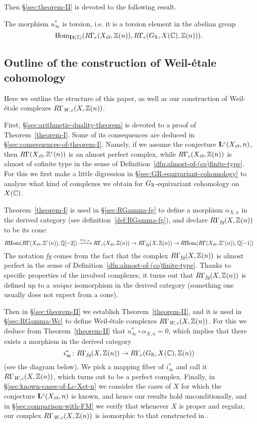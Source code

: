 \documentclass{article}
\numberwithin{equation}{section}
\begin{document}
Then \S\ref{sec:theorem-II} is devoted to the following result.

\begin{maintheorem}
  \label{theorem-II}
  The morphism $u_\infty^*$ is torsion, i.e. it is a torsion element in the
  abelian group
  $$\Hom_{\mathbf{D} (\ZZ)} (R\Gamma_c (X_\et, \ZZ(n)), R\Gamma_c (G_\RR, X (\CC), \ZZ(n))).$$
\end{maintheorem}

\subsection*{Outline of the construction of Weil-étale cohomology}

Here we outline the structure of this paper, as well as our construction of
Weil-étale complexes $R\Gamma_\Wc (X, \ZZ (n))$.

First, \S\ref{sec:arithmetic-duality-theorem} is devoted to a proof of
Theorem~\ref{theorem-I}. Some of its consequences are deduced in
\S\ref{sec:consequences-of-theorem-I}. Namely, if we assume the conjecture
$\mathbf{L}^c (X_\et, n)$, then $R\Gamma (X_\et, \ZZ^c (n))$ is an almost
perfect complex, while $R\Gamma_c (X_\et, \ZZ (n))$ is almost of cofinite type
in the sense of Definition~\ref{dfn:almost-of-(co)finite-type}. For this we
first make a little digression in \S\ref{sec:GR-equivariant-cohomology} to
analyze what kind of complexes we obtain for $G_\RR$-equivariant cohomology on
$X (\CC)$.

Theorem~\ref{theorem-I} is used in \S\ref{sec:RGamma-fg} to define a morphism
$\alpha_{X,n}$ in the derived category (see definition~\ref{def:RGamma-fg}),
and declare $R\Gamma_\fg (X, \ZZ(n))$ to be its cone:
\[ \RHom (R\Gamma (X_\et, \ZZ^c (n)), \QQ [-2]) \xrightarrow{\alpha_{X,n}}
R\Gamma_c (X_\et, \ZZ (n)) \to
R\Gamma_\fg (X, \ZZ(n)) \to
\RHom (R\Gamma (X_\et, \ZZ^c (n)), \QQ [-1]) \]
The notation \emph{fg} comes from the fact that the complex
$R\Gamma_\fg (X, \ZZ(n))$ is almost perfect in the sense of
Definition~\ref{dfn:almost-of-(co)finite-type}. Thanks to specific properties
of the involved complexes, it turns out that $R\Gamma_\fg (X, \ZZ(n))$ is
defined up to a \emph{unique} isomorphism in the derived category (something one
usually does not expect from a cone).

Then in \S\ref{sec:theorem-II} we establish Theorem~\ref{theorem-II}, and it is
used in \S\ref{sec:RGamma-Wc} to define Weil-étale complexes
$R\Gamma_\Wc (X, \ZZ(n))$. For this we deduce from Theorem~\ref{theorem-II} that
$u_\infty^* \circ \alpha_{X,n} = 0$, which implies that there exists a morphism
in the derived category
$$i_\infty^*\colon R\Gamma_\fg (X, \ZZ (n)) \to R\Gamma_c (G_\RR, X (\CC), \ZZ(n))$$
(see the diagram below). We pick a mapping fiber of $i_\infty^*$ and call it
$R\Gamma_\Wc (X, \ZZ (n))$, which turns out to be a perfect complex.
Finally, in \S\ref{sec:known-cases-of-Lc-Xet-n} we consider the cases of $X$ for
which the conjecture $\mathbf{L}^c (X_\et, n)$ is known, and hence our results
hold unconditionally, and in \S\ref{sec:comparison-with-FM} we verify that
whenever $X$ is proper and regular, our complex $R\Gamma_\Wc (X, \ZZ (n))$ is
isomorphic to that constructed in \cite{Flach-Morin-2018}.
\end{document}
